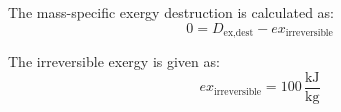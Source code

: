 The mass-specific exergy destruction is calculated as:  
\[
0 = D_{\text{ex,dest}} - ex_{\text{irreversible}}
\]

The irreversible exergy is given as:  
\[
ex_{\text{irreversible}} = 100 \, \frac{\text{kJ}}{\text{kg}}
\]